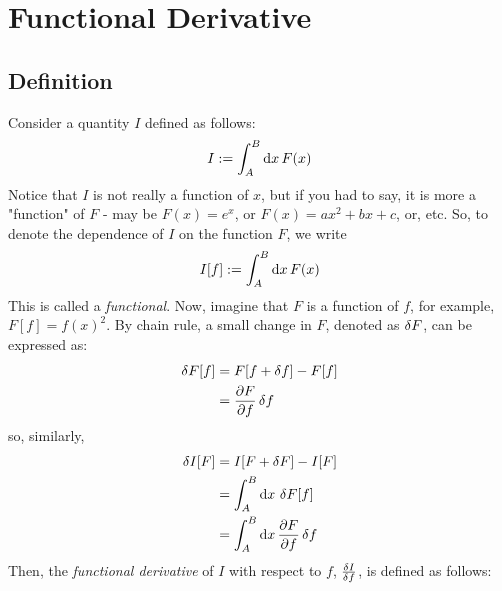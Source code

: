 \section{Functional Derivative}
\subsection{Definition}
Consider a quantity $I$ defined as follows:
\begin{align}
  I := \int_A^B \odif{x} \, F(x)
\end{align}
Notice that $I$ is not really a function of $x$, but if you had to say, it is more a "function" of $F$ - may be $F(x) = e^x$, or $F(x) = a x^2 + bx + c$, or, etc.
So, to denote the dependence of $I$ on the function $F$, we write
\begin{align}
  I[f] := \int_A^B \odif{x} \, F(x)
\end{align}
This is called a \emph{functional}.
Now, imagine that $F$ is a function of $f$, for example, $F[f] = f(x)^2$.
By chain rule, a small change in $F$, denoted as $\fdif{F}$, can be expressed as:
\begin{align}
  \fdif{F}[f] & = F[f + \fdif{f}] - F[f] \\
              & = \pdv{F}{f} \fdif{f}
\end{align}
so, similarly,
\begin{align}
  \fdif{I}[F] & = I[F + \fdif{F}] - I[F]                   \\
              & = \int_A^B \odif{x} \, \fdif{F}[f]         \\
              & = \int_A^B \odif{x} \, \pdv{F}{f} \fdif{f}
\end{align}
Then, the \emph{functional derivative} of $I$ with respect to $f$, $\fdv{I}{f}$, is defined as follows:


